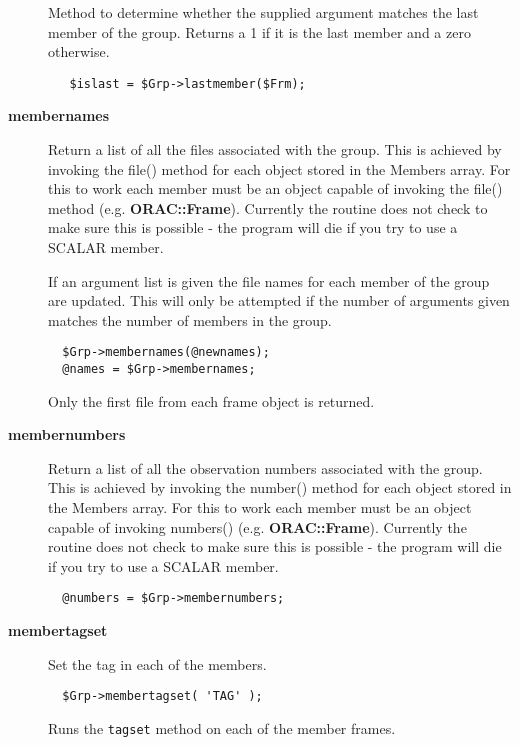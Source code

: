 \begin{description}
Method to determine whether the supplied argument
matches the last member of the group. Returns a 1 if
it is the last member and a zero otherwise.

\begin{verbatim}
   $islast = $Grp->lastmember($Frm);
\end{verbatim}
\item[\textbf{membernames}] \mbox{}

Return a list of all the files associated with the group. This is
achieved by invoking the file() method for each object stored in the
Members array.  For this to work each member must be an object capable
of invoking the file() method (e.g. \textbf{ORAC::Frame}). Currently the
routine does not check to make sure this is possible - the program
will die if you try to use a SCALAR member.



If an argument list is given the file names for each member of the
group are updated. This will only be attempted if the number of 
arguments given matches the number of members in the group.

\begin{verbatim}
  $Grp->membernames(@newnames);
  @names = $Grp->membernames;
\end{verbatim}


Only the first file from each frame object is returned.

\item[\textbf{membernumbers}] \mbox{}

Return a list of all the observation numbers associated with
the group. This is achieved by invoking the number() method for
each object stored in the Members array.
For this to work each member must be an object capable of invoking
numbers() (e.g. \textbf{ORAC::Frame}). Currently the routine does not check
to make sure this is possible - the program will die if you try
to use a SCALAR member.

\begin{verbatim}
  @numbers = $Grp->membernumbers;
\end{verbatim}
\item[\textbf{membertagset}] \mbox{}

Set the tag in each of the members.

\begin{verbatim}
  $Grp->membertagset( 'TAG' );
\end{verbatim}


Runs the \texttt{tagset} method on each of the member frames.


\end{description}
